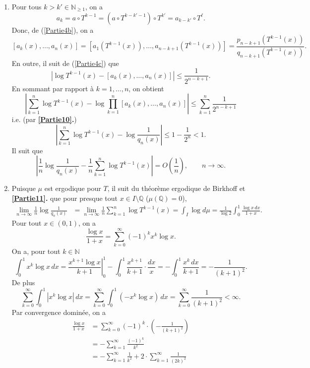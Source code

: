 \documentclass[french]{article}
\theoremstyle{definition}
\newcommand{\tuple}[1]{\left(#1\right)}
\newcommand{\oin}[1]{\left(#1\right)}
\newcommand{\abs}[1]{\left|#1\right|}
\newcommand{\Nbb}{\mathbb{N}}
\newcommand{\Qbb}{\mathbb{Q}}
\begin{document}
\begin{enumerate}
    \item \label{Partie11}
        Pour tous $k > k' \in \Nbb_{\ge 1}$, on a 
            $$a_{k} = a \circ T^{k-1} = (a \circ T^{k-k'-1}) \circ T^{k'} = a_{k - k'} \circ T^\ell.$$
        Donc, de (\ref{Partie4b}), on a
            $$[a_k(x),\ldots,a_n(x)] = [a_1(T^{k-1}(x)),\ldots,a_{n-k+1}(T^{k-1}(x))] = \frac{p_{n-k+1}(T^{k-1}(x))}{q_{n-k+1}(T^{k-1}(x))}.$$
        En outre, il suit de (\ref{Partie4c}) que
            $$|\log T^{k-1}(x) - [a_k(x),\ldots,a_n(x)]| \le \frac{1}{2^{n-k+1}}.$$
        En sommant par rapport \`a $k = 1,\ldots,n$, on obtient
            $$\abs{\sum_{k=1}^n \log T^{k-1}(x) - \log\prod_{k=1}^n [a_k(x),\ldots,a_n(x)]} \le \sum_{k=1}^n \frac{1}{2^{n-k+1}}$$
        i.e. (par {\bf \ref{Partie10}.})
            $$\abs{\sum_{k=1}^n \log T^{k-1}(x) - \log \frac{1}{q_n(x)}} \le 1 - \frac{1}{2^{n}} < 1.$$
        Il suit que
            $$\abs{\frac{1}{n}\log \frac{1}{q_n(x)} - \frac{1}{n}\sum_{k=1}^n \log T^{k-1}(x)} = O\tuple{\frac{1}{n}}, \qquad n \to \infty.$$
    \item \label{Partie12}
        Puisque $\mu$ est ergodique pour $T$, il suit du th\'eor\`eme ergodique de Birkhoff et {\bf \ref{Partie11}.} que pour presque tout $x \in I \setminus \Qbb$ ($\mu(\Qbb) = 0$), 
            \begin{align*}
                \lim_{n \to \infty}\frac{1}{n}\log\frac{1}{q_n(x)} & = \lim_{n \to \infty}\frac{1}{n}\sum_{k=1}^n \log T^{k-1}(x) = \int_I \log d\mu = \frac{1}{\log 2}\int_0^1 \frac{\log x\, dx}{1+x}.
            \end{align*}
        Pour tout $x \in (0,1)$, on a
            $$\frac{\log x}{1 + x} = \sum_{k = 0}^{\infty}(-1)^k x^k\log x.$$
        On a, pour tout $k \in \Nbb$
            $$\int_0^1 x^k \log x\,dx = \left. \frac{x^{k+1}\log x}{k+1} \right|_0^1 - \int_0^1 \frac{x^{k+1}}{k+1}\cdot \frac{dx}{x} = -\int_0^1 \frac{x^k\,dx}{k+1} = -\frac{1}{(k+1)^2}.$$
        De plus
            $$\sum_{k = 0}^{\infty}\int_0^1 |x^k \log x|\,dx = \sum_{k = 0}^{\infty} \int_0^1(-x^k \log x)\,dx = \sum_{k=0}^{\infty} \frac{1}{(k+1)^2} < \infty.$$
        Par convergence domin\'ee, on a
            \begin{align*}
                \frac{\log x}{1 + x} & = \sum_{k=0}^{\infty}(-1)^k \cdot \oin{-\frac{1}{(k+1)^2}} \\
                & = -\sum_{k=1}^{\infty} \frac{(-1)^k}{k^2}\\
                & = -\sum_{k=1}^{\infty}\frac{1}{k^2} + 2\cdot \sum_{k=1}^{\infty} \frac{1}{(2k)^2}\\

\end{align*}
\end{enumerate}
\end{document}

